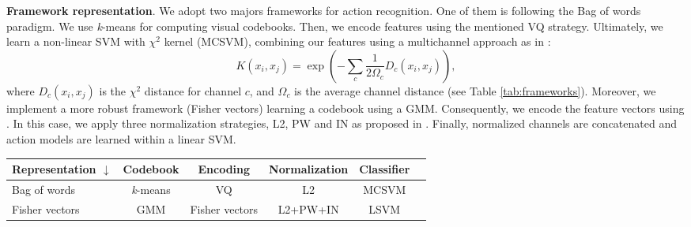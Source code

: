 \textbf{Framework representation}. We adopt two majors frameworks for action recognition. One of them is following the Bag of words paradigm. We use \textit{k}-means for computing visual codebooks. Then, we encode features using the mentioned VQ strategy. Ultimately, we learn a non-linear SVM with $\chi^2$ kernel (MCSVM), combining our features using a multichannel approach as in \cite{zhang2007}:
\begin{equation}
K(x_i,x_j)= \exp(-\sum_c {\frac{1}{2\Omega_c} D_c(x_i,x_j)}),
\label{eq:multichannel}
\end{equation}
where $D_c(x_i,x_j)$ is the $\chi^2$ distance for channel $c$, and $\Omega_c$ is the average channel distance (see Table \ref{tab:frameworks}). Moreover, we implement a more robust framework (Fisher vectors) learning a codebook using a GMM. Consequently, we encode the feature vectors using \cite{perronnin2010}. In this case, we apply three normalization strategies, L2, PW and IN as proposed in \cite{xwang2013}. Finally, normalized channels are concatenated and action models are learned within a linear SVM.

\begin{figure*}[t!]
\begin{center}
\fbox{\rule{0pt}{1.2in} \rule{0.9\linewidth}{0pt}}
\end{center}
\caption{Effect of feature sub-sampling when generating codebook.}
\label{fig:feature_sampling}
\end{figure*}

\begin{table*}[h!]
\caption{Comparison of adopted frameworks for action recognition.}
\begin{center}
{
\begin{tabular}{ l| c c c c c }
\hline
Representation $\downarrow$ & Codebook & Encoding & Normalization & Classifier \\
\hline
Bag of words & \textit{k}-means & VQ & L2 & MCSVM \\
Fisher vectors & GMM & Fisher vectors & L2+PW+IN & LSVM \\
\hline
\end{tabular}
}
\end{center}
\label{tab:frameworks}
\end{table*}

